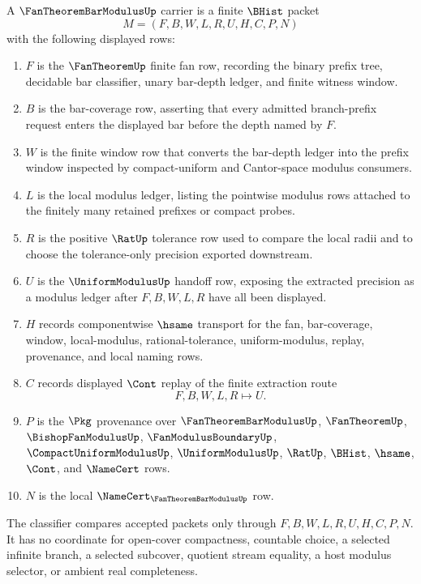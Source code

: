 \begin{definition}
\label{def:fan-theorem-bar-modulus-carrier}
A $\FanTheoremBarModulusUp$ carrier is a finite $\BHist$ packet
$$
M=(F,B,W,L,R,U,H,C,P,N)
$$
with the following displayed rows:
\begin{enumerate}
\item $F$ is the $\FanTheoremUp$ finite fan row, recording the binary prefix tree, decidable bar classifier, unary bar-depth ledger, and finite witness window.
\item $B$ is the bar-coverage row, asserting that every admitted branch-prefix request enters the displayed bar before the depth named by $F$.
\item $W$ is the finite window row that converts the bar-depth ledger into the prefix window inspected by compact-uniform and Cantor-space modulus consumers.
\item $L$ is the local modulus ledger, listing the pointwise modulus rows attached to the finitely many retained prefixes or compact probes.
\item $R$ is the positive $\RatUp$ tolerance row used to compare the local radii and to choose the tolerance-only precision exported downstream.
\item $U$ is the $\UniformModulusUp$ handoff row, exposing the extracted precision as a modulus ledger after $F,B,W,L,R$ have all been displayed.
\item $H$ records componentwise $\hsame$ transport for the fan, bar-coverage, window, local-modulus, rational-tolerance, uniform-modulus, replay, provenance, and local naming rows.
\item $C$ records displayed $\Cont$ replay of the finite extraction route
$$
F,B,W,L,R \longmapsto U .
$$
\item $P$ is the $\Pkg$ provenance over $\FanTheoremBarModulusUp$, $\FanTheoremUp$, $\BishopFanModulusUp$, $\FanModulusBoundaryUp$, $\CompactUniformModulusUp$, $\UniformModulusUp$, $\RatUp$, $\BHist$, $\hsame$, $\Cont$, and $\NameCert$ rows.
\item $N$ is the local $\NameCert_{\FanTheoremBarModulusUp}$ row.
\end{enumerate}
The classifier compares accepted packets only through $F,B,W,L,R,U,H,C,P,N$. It has no coordinate for open-cover compactness, countable choice, a selected infinite branch, a selected subcover, quotient stream equality, a host modulus selector, or ambient real completeness.
\end{definition}

